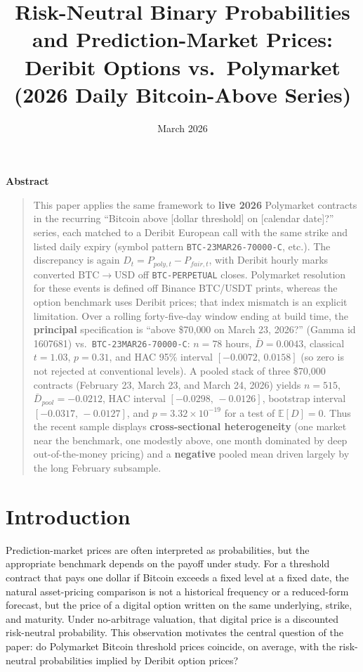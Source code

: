 \documentclass[11pt]{article}
\title{Risk-Neutral Binary Probabilities and Prediction-Market Prices:\\ Deribit Options vs.\ Polymarket (2026 Daily Bitcoin-Above Series)}
\author{}
\date{March 2026}
\makeatletter
\numberwithin{equation}{section}
\theoremstyle{plain}
\renewcommand{\maketitle}{%
  \begin{center}
    {\LARGE \bfseries \@title \par}
    \vspace{1em}
    {\normalsize \@date \par}
  \end{center}
  \vspace{1em}
}
\renewenvironment{abstract}
  {\begin{center}\bfseries Abstract\end{center}\begin{quote}\small}
  {\end{quote}\vspace{1em}}
\makeatother
\begin{document}
\maketitle

\begin{abstract}
This paper applies the same framework to \textbf{live 2026} Polymarket contracts in the recurring ``Bitcoin above [dollar threshold] on [calendar date]?'' series, each matched to a Deribit European call with the same strike and listed daily expiry (symbol pattern \texttt{BTC-23MAR26-70000-C}, etc.). The discrepancy is again $D_t = P_{poly,t} - P_{fair,t}$, with Deribit hourly marks converted BTC$\to$USD off \texttt{BTC-PERPETUAL} closes. Polymarket resolution for these events is defined off Binance BTC/USDT prints, whereas the option benchmark uses Deribit prices; that index mismatch is an explicit limitation. Over a rolling forty-five-day window ending at build time, the \textbf{principal} specification is ``above \$70{,}000 on March 23, 2026?'' (Gamma id 1607681) vs.\ \texttt{BTC-23MAR26-70000-C}: $n=78$ hours, $\bar{D}=0.0043$, classical $t=1.03$, $p=0.31$, and HAC 95\% interval $[-0.0072,\,0.0158]$ (so zero is not rejected at conventional levels). A pooled stack of three \$70{,}000 contracts (February 23, March 23, and March 24, 2026) yields $n=515$, $\bar{D}_{pool}=-0.0212$, HAC interval $[-0.0298,\,-0.0126]$, bootstrap interval $[-0.0317,\,-0.0127]$, and $p=3.32\times 10^{-19}$ for a test of $\mathbb{E}[D]=0$. Thus the recent sample displays \textbf{cross-sectional heterogeneity} (one market near the benchmark, one modestly above, one month dominated by deep out-of-the-money pricing) and a \textbf{negative} pooled mean driven largely by the long February subsample.
\end{abstract}

\section{Introduction}
Prediction-market prices are often interpreted as probabilities, but the appropriate benchmark depends on the payoff under study. For a threshold contract that pays one dollar if Bitcoin exceeds a fixed level at a fixed date, the natural asset-pricing comparison is not a historical frequency or a reduced-form forecast, but the price of a digital option written on the same underlying, strike, and maturity. Under no-arbitrage valuation, that digital price is a discounted risk-neutral probability. This observation motivates the central question of the paper: do Polymarket Bitcoin threshold prices coincide, on average, with the risk-neutral probabilities implied by Deribit option prices?
\end{document}
